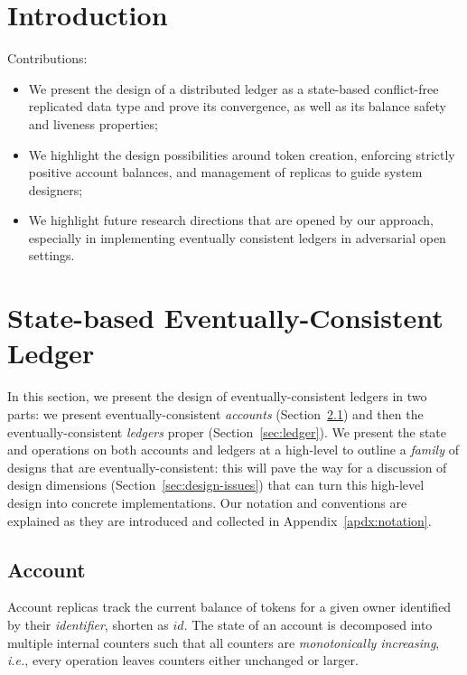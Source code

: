 \documentclass[9pt, oneside]{article}   	%
\begin{document}
\section{Introduction}
\label{sec:introduction}

Contributions:
\begin{itemize}
	\item We present the design of a distributed ledger as a state-based conflict-free replicated data type and prove its convergence, as well as its balance safety and liveness properties;
	\item We highlight the design possibilities around token creation, enforcing strictly positive account balances, and management of replicas to guide system designers;
	\item We highlight future research directions that are opened by our approach, especially in implementing eventually consistent ledgers in adversarial open settings.
\end{itemize}

\section{State-based Eventually-Consistent Ledger}

In this section, we present the design of eventually-consistent ledgers in two parts: we present eventually-consistent \textit{accounts} (Section~\ref{sec:account}) and then the eventually-consistent \textit{ledgers} proper (Section~\ref{sec:ledger}). We present the state and operations on both accounts and ledgers at a high-level to outline a \textit{family} of designs that are eventually-consistent: this will pave the way for a discussion of design dimensions (Section~\ref{sec:design-issues}) that can turn this high-level design into concrete implementations. Our notation and conventions are explained as they are introduced and collected in Appendix~\ref{apdx:notation}.

\subsection{Account}
\label{sec:account}

Account replicas track the current balance of tokens for a given owner identified by their \textit{identifier}, shorten as $id$. The state of an account is decomposed into multiple internal counters such that all counters are \textit{monotonically increasing}, \textit{i.e.}, every operation leaves counters either unchanged or larger. 
\end{document}
